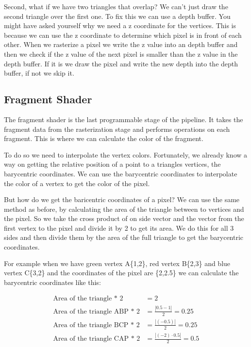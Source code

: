 \documentclass[12pt]{report} \usepackage{preamble}
\begin{document}
Second, what if we have two triangles that overlap? We can't just draw the second triangle over the first one. To fix this we can use a depth buffer.
You might have asked yourself why we need a z coordinate for the vertices. This is because we can use the z coordinate to determine which pixel is
in front of each other. When we rasterize a pixel we write the z value into an depth buffer and then we check if the z value of the next pixel is
smaller than the z value in the depth buffer. If it is we draw the pixel and write the new depth into the depth buffer, if not we skip it.

\subsection{Fragment Shader}

The fragment shader is the last programmable stage of the pipeline. It takes the fragment data from the rasterization stage and performs
operations on each fragment. This is where we can calculate the color of the fragment.

To do so we need to interpolate the vertex colors.
Fortunately, we already know a way on getting the relative position of a point to a triangles vertices, the barycentric coordinates.
We can use the barycentric coordinates to interpolate the color of a vertex to get the color of the pixel.

But how do we get the baricentric coordinates of a pixel? We can use the same method as before, by calculating the area of the triangle
between to vertices and the pixel. So we take the cross product of on side vector and the vector from the first vertex to the pixel
and divide it by 2 to get its area. We do this for all 3 sides and then divide them by the area of the full triangle to get the barycentric coordinates.

For example when we have green vertex A\{1,2\}, red vertex B\{2,3\} and blue vertex C\{3,2\} and the coordinates of the pixel are
\{2,2.5\} we can calculate the barycentric coordinates like this:

\[
	\begin{aligned}
		\text{Area of the triangle * 2}     & = 2                                             \\
		\text{Area of the triangle ABP * 2} & = \frac{\left| 0.5 - 1 \right|}{2} = 0.25       \\
		\text{Area of the triangle BCP * 2} & = \frac{\left| (-0.5) \right|}{2} = 0.25        \\
		\text{Area of the triangle CAP * 2} & = \frac{\left| (-2) \cdot 0.5 \right|}{2} = 0.5 \\
	\end{aligned}
\]
\end{document}
